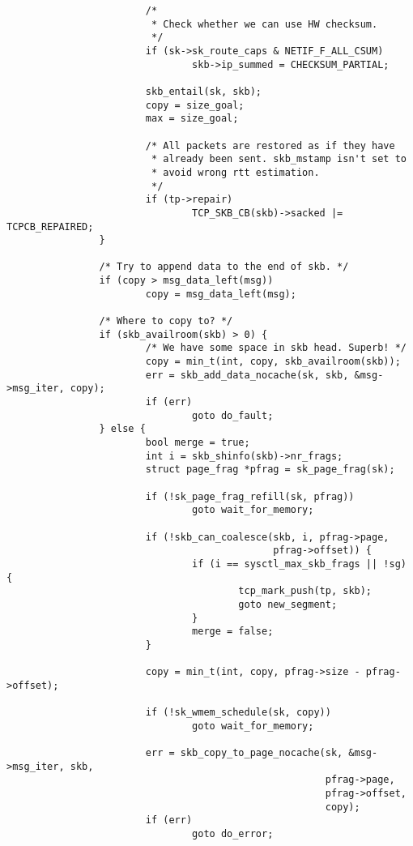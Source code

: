 \begin{verbatim}
                        /*
                         * Check whether we can use HW checksum.
                         */
                        if (sk->sk_route_caps & NETIF_F_ALL_CSUM)
                                skb->ip_summed = CHECKSUM_PARTIAL;

                        skb_entail(sk, skb);
                        copy = size_goal;
                        max = size_goal;

                        /* All packets are restored as if they have
                         * already been sent. skb_mstamp isn't set to
                         * avoid wrong rtt estimation.
                         */
                        if (tp->repair)
                                TCP_SKB_CB(skb)->sacked |= TCPCB_REPAIRED;
                }

                /* Try to append data to the end of skb. */
                if (copy > msg_data_left(msg))
                        copy = msg_data_left(msg);

                /* Where to copy to? */
                if (skb_availroom(skb) > 0) {
                        /* We have some space in skb head. Superb! */
                        copy = min_t(int, copy, skb_availroom(skb));
                        err = skb_add_data_nocache(sk, skb, &msg->msg_iter, copy);
                        if (err)
                                goto do_fault;
                } else {
                        bool merge = true;
                        int i = skb_shinfo(skb)->nr_frags;
                        struct page_frag *pfrag = sk_page_frag(sk);

                        if (!sk_page_frag_refill(sk, pfrag))
                                goto wait_for_memory;

                        if (!skb_can_coalesce(skb, i, pfrag->page,
                                              pfrag->offset)) {
                                if (i == sysctl_max_skb_frags || !sg) {
                                        tcp_mark_push(tp, skb);
                                        goto new_segment;
                                }
                                merge = false;
                        }

                        copy = min_t(int, copy, pfrag->size - pfrag->offset);

                        if (!sk_wmem_schedule(sk, copy))
                                goto wait_for_memory;

                        err = skb_copy_to_page_nocache(sk, &msg->msg_iter, skb,
                                                       pfrag->page,
                                                       pfrag->offset,
                                                       copy);
                        if (err)
                                goto do_error;


\end{verbatim}
